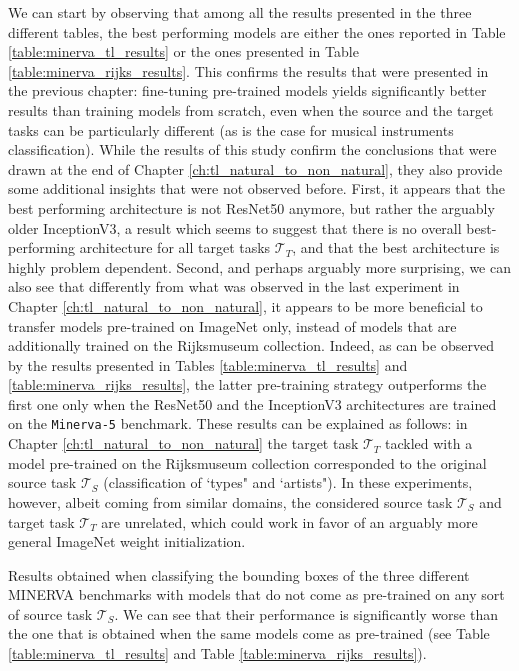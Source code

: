 We can start by observing that among all the results presented in the three different tables, the best performing models are either the ones reported in Table \ref{table:minerva_tl_results} or the ones presented in Table \ref{table:minerva_rijks_results}. This confirms the results that were presented in the previous chapter: fine-tuning pre-trained models yields significantly better results than training models from scratch, even when the source and the target tasks can be particularly different (as is the case for musical instruments classification). While the results of this study confirm the conclusions that were drawn at the end of Chapter \ref{ch:tl_natural_to_non_natural}, they also provide some additional insights that were not observed before. First, it appears that the best performing architecture is not ResNet50 anymore, but rather the arguably older InceptionV3, a result which seems to suggest that there is no overall best-performing architecture for all target tasks $\mathcal{T}_T$, and that the best architecture is highly problem dependent. Second, and perhaps arguably more surprising, we can also see that differently from what was observed in the last experiment in Chapter \ref{ch:tl_natural_to_non_natural}, it appears to be more beneficial to transfer models pre-trained on ImageNet only, instead of models that are additionally trained on the Rijksmuseum collection. Indeed, as can be observed by the results presented in Tables \ref{table:minerva_tl_results} and \ref{table:minerva_rijks_results}, the latter pre-training strategy outperforms the first one only when the ResNet50 and the InceptionV3 architectures are trained on the \texttt{Minerva-5} benchmark. These results can be explained as follows: in Chapter \ref{ch:tl_natural_to_non_natural} the target task $\mathcal{T}_T$ tackled with a model pre-trained on the Rijksmuseum collection corresponded to the original source task $\mathcal{T}_S$ (classification of `types" and `artists"). In these experiments, however, albeit coming from similar domains, the considered source task $\mathcal{T}_S$ and target task $\mathcal{T}_T$ are unrelated, which could work in favor of an arguably more general ImageNet weight initialization.


\begin{table}[ht!]
	\caption{Results obtained when classifying the bounding boxes of the three different MINERVA benchmarks with models that do not come as pre-trained on any sort of source task $\mathcal{T}_S$. We can see that their performance is significantly worse than the one that is obtained when the same models come as pre-trained (see Table \ref{table:minerva_tl_results} and Table \ref{table:minerva_rijks_results}).}
\resizebox{\columnwidth}{!}{%
}
\label{table:minerva_no_tl_results}
\end{table}



